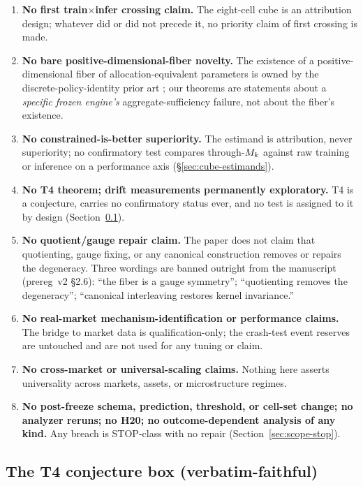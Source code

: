 \begin{enumerate}
\item \textbf{No first train$\times$infer crossing claim.} The eight-cell
  cube is an attribution design; whatever did or did not precede it, no
  priority claim of first crossing is made.
\item \textbf{No bare positive-dimensional-fiber novelty.} The existence of a
  positive-dimensional fiber of allocation-equivalent parameters is owned by
  the discrete-policy-identity prior art \citep{dpiot2022}; our theorems are
  statements about a \emph{specific frozen engine's} aggregate-sufficiency
  failure, not about the fiber's existence.
\item \textbf{No constrained-is-better superiority.} The estimand is
  attribution, never superiority; no confirmatory test compares through-$M_k$
  against raw training or inference on a performance axis
  (\S\ref{sec:cube-estimands}).
\item \textbf{No T4 theorem; drift measurements permanently exploratory.} T4
  is a conjecture, carries no confirmatory status ever, and no test is
  assigned to it by design (Section~\ref{sec:scope-t4}).
\item \textbf{No quotient/gauge repair claim.} The paper does not claim that
  quotienting, gauge fixing, or any canonical construction removes or repairs
  the degeneracy. Three wordings are banned outright from the manuscript
  (prereg~v2 \S2.6): ``the fiber is a gauge symmetry''; ``quotienting removes
  the degeneracy''; ``canonical interleaving restores kernel invariance.''
\item \textbf{No real-market mechanism-identification or performance
  claims.} The bridge to market data is qualification-only; the crash-test
  event reserves are untouched and are not used for any tuning or claim.
\item \textbf{No cross-market or universal-scaling claims.} Nothing here
  asserts universality across markets, assets, or microstructure regimes.
\item \textbf{No post-freeze schema, prediction, threshold, or cell-set
  change; no analyzer reruns; no H20; no outcome-dependent analysis of any
  kind.} Any breach is STOP-class with no repair
  (Section~\ref{sec:scope-stop}).
\end{enumerate}

\subsection{The T4 conjecture box (verbatim-faithful)}
\label{sec:scope-t4}

